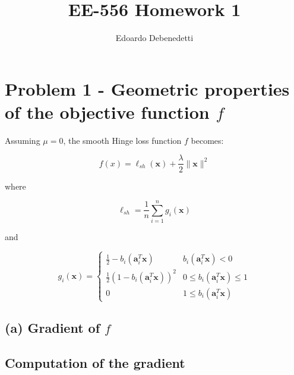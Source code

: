 \documentclass[12pt]{article}
\title{EE-556 Homework 1}
\author{Edoardo Debenedetti}
\newcommand{\xb}{\mathbf{x}}
\newcommand{\ab}{\mathbf{a}}
\newcommand{\abi}{\ab_i}
\newcommand{\xnorm}{\lVert \mathbf{\xb} \rVert}
\newcommand{\sumin}{\sum_{i = 1}^n}
\newcommand{\ellsh}{\ell_{sh}}
\newcommand{\ax}{\abi^T\xb}
\begin{document}
\maketitle

\vspace{0.5in}



\section*{Problem 1 - Geometric properties of the objective function $f$}

Assuming $\mu = 0$, the smooth Hinge loss function $f$ becomes:

\begin{equation} \label{def:hinge_loss}
    f(x) = \ellsh(\xb) + \frac{\lambda}{2} \xnorm ^ 2
\end{equation}

where

\begin{equation} \label{def:l}
    \ellsh = \frac{1}{n} \sumin g_i(\xb)
\end{equation}

and

\begin{equation}
    g_i(\xb) = \begin{cases} \label{def:g}
    \frac{1}{2} - b_i(\ax)         & b_i(\ax) < 0 \\
    \frac{1}{2}(1 - b_i(\ax))^2    & 0 \leq b_i(\ax) \leq 1 \\
    0                                   & 1 \le b_i(\ax)
\end{cases}
\end{equation}

\subsection*{(a) Gradient of $f$}

\subsection*{Computation of the gradient}
\end{document}
